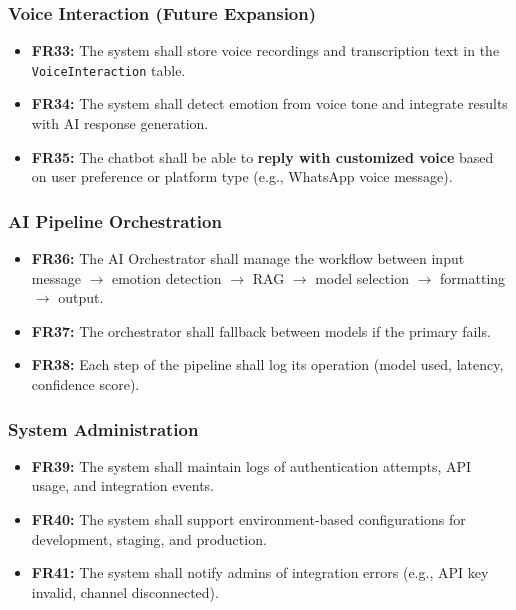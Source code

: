 \documentclass[12pt,a4paper]{article}
\begin{document}
\subsubsection{Voice Interaction (Future Expansion)}
\begin{itemize}
    \item \textbf{FR33:} The system shall store voice recordings and transcription text in the \texttt{VoiceInteraction} table.
    \item \textbf{FR34:} The system shall detect emotion from voice tone and integrate results with AI response generation.
    \item \textbf{FR35:} The chatbot shall be able to \textbf{reply with customized voice} based on user preference or platform type (e.g., WhatsApp voice message).
\end{itemize}

\vspace{1em}
\noindent\hrulefill
\vspace{1em}

\subsubsection{AI Pipeline Orchestration}
\begin{itemize}
    \item \textbf{FR36:} The AI Orchestrator shall manage the workflow between input message $\rightarrow$ emotion detection $\rightarrow$ RAG $\rightarrow$ model selection $\rightarrow$ formatting $\rightarrow$ output.
    \item \textbf{FR37:} The orchestrator shall fallback between models if the primary fails.
    \item \textbf{FR38:} Each step of the pipeline shall log its operation (model used, latency, confidence score).
\end{itemize}

\vspace{1em}
\noindent\hrulefill
\vspace{1em}

\subsubsection{System Administration}
\begin{itemize}
    \item \textbf{FR39:} The system shall maintain logs of authentication attempts, API usage, and integration events.
    \item \textbf{FR40:} The system shall support environment-based configurations for development, staging, and production.
    \item \textbf{FR41:} The system shall notify admins of integration errors (e.g., API key invalid, channel disconnected).
\end{itemize}
\end{document}
